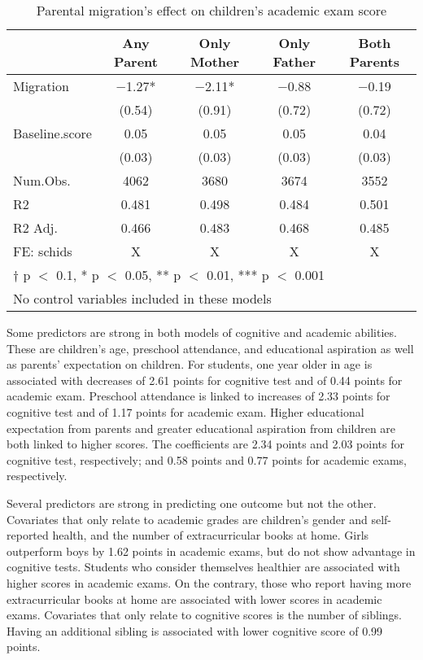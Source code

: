 \documentclass[
  man,floatsintext]{apa7}
\begin{document}
\begin{table}

\caption{Parental migration’s effect on children’s academic exam score}
\centering
\begin{tabular}[t]{lcccc}
\toprule
  & Any Parent & Only Mother & Only Father & Both Parents\\
\midrule
Migration & \num{-1.27}* & \num{-2.11}* & \num{-0.88} & \num{-0.19}\\
 & (\num{0.54}) & (\num{0.91}) & (\num{0.72}) & (\num{0.72})\\
Baseline.score & \num{0.05} & \num{0.05} & \num{0.05} & \num{0.04}\\
 & (\num{0.03}) & (\num{0.03}) & (\num{0.03}) & (\num{0.03})\\
\midrule
Num.Obs. & \num{4062} & \num{3680} & \num{3674} & \num{3552}\\
R2 & \num{0.481} & \num{0.498} & \num{0.484} & \num{0.501}\\
R2 Adj. & \num{0.466} & \num{0.483} & \num{0.468} & \num{0.485}\\
FE: schids & X & X & X & X\\
\bottomrule
\multicolumn{5}{l}{\rule{0pt}{1em}† p $<$ 0.1, * p $<$ 0.05, ** p $<$ 0.01, *** p $<$ 0.001}\\
\multicolumn{5}{l}{\rule{0pt}{1em}No control variables included in these models}\\
\end{tabular}
\end{table}

Some predictors are strong in both models of cognitive and academic abilities. These are children's age, preschool attendance, and educational aspiration as well as parents' expectation on children. For students, one year older in age is associated with decreases of 2.61 points for cognitive test and of 0.44 points for academic exam. Preschool attendance is linked to increases of 2.33 points for cognitive test and of 1.17 points for academic exam. Higher educational expectation from parents and greater educational aspiration from children are both linked to higher scores. The coefficients are 2.34 points and 2.03 points for cognitive test, respectively; and 0.58 points and 0.77 points for academic exams, respectively.

Several predictors are strong in predicting one outcome but not the other. Covariates that only relate to academic grades are children's gender and self-reported health, and the number of extracurricular books at home. Girls outperform boys by 1.62 points in academic exams, but do not show advantage in cognitive tests. Students who consider themselves healthier are associated with higher scores in academic exams. On the contrary, those who report having more extracurricular books at home are associated with lower scores in academic exams. Covariates that only relate to cognitive scores is the number of siblings. Having an additional sibling is associated with lower cognitive score of 0.99 points.
\end{document}
